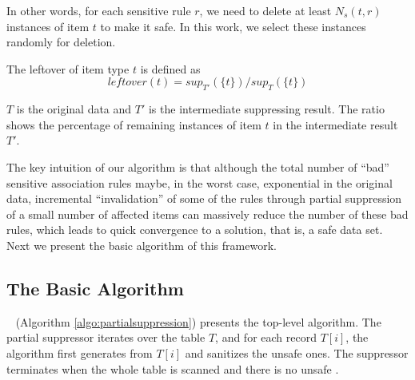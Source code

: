 In other words, for each sensitive rule $r$,
we need to delete at least $N_s(t, r)$ instances of item $t$ to make it safe.
In this work, we select these instances randomly for deletion.

\begin{definition}[Leftover]
 The leftover of item type $t$ is defined as
\begin{equation}
leftover(t)={sup_{T'}(\{t\})}/{sup_T(\{t\})}
\end{equation}
\end{definition}
$T$ is the original data and $T'$ is the intermediate suppressing result.
The ratio shows the percentage of remaining instances of item $t$
in the intermediate result $T'$.


The key intuition of our algorithm is that although the total number of
``bad'' sensitive association rules
maybe, in the worst case, exponential in the original data, incremental
``invalidation'' of some of the rules through partial suppression of a
small number of affected items can massively reduce the number of these bad
rules, which leads to quick convergence to a solution, that is, a
safe data set.
%
Next we present the basic algorithm of this framework.

\subsection{The Basic Algorithm}
\label{sec:basic}

\PartialSuppression~ (Algorithm \ref{algo:partialsuppression}) presents the
top-level algorithm. The partial suppressor iterates over the table $T$, and
for each record $T[i]$, the algorithm first generates  \qids from $T[i]$ and
sanitizes the unsafe ones. The suppressor terminates when the whole table is
scanned and there is no unsafe \qid.

